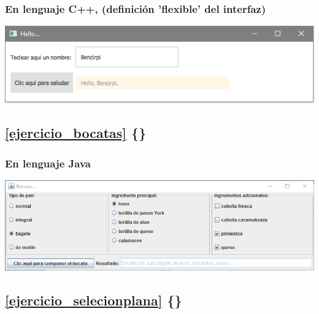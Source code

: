 \documentclass[spanish,12pt,a4paper,final,oneside]{book}
\begin{document}
\subsubsection*{En lenguaje C++, (definición 'flexible' del interfaz)} \lstset{language=C++} 
\includegraphics[width=\textwidth]{HelloBenzirpi_bis - pantallazo - C++}



\vspace{2cm}
\subsection*{\ref{ejercicio_bocatas} \{\}}
\vspace{0.5cm}
\subsubsection*{En lenguaje Java} \lstset{language=Java} 
\includegraphics[width=\textwidth]{Bocatas - pantallazo - Java}




\vspace{2cm}
\subsection*{\ref{ejercicio_selecionplana} \{\}}
\vspace{0.5cm}
\end{document}
